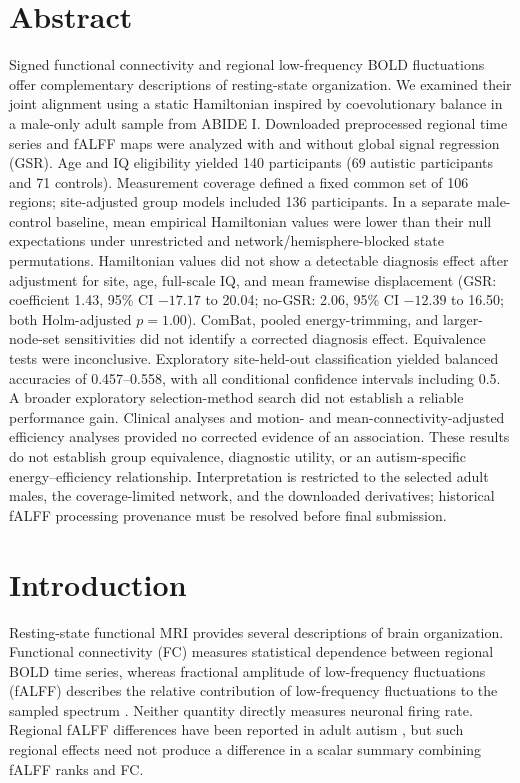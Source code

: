 \documentclass[10pt,letterpaper]{article}
\begin{document}
\section*{Abstract}
Signed functional connectivity and regional low-frequency BOLD fluctuations offer
complementary descriptions of resting-state organization. We examined their joint
alignment using a static Hamiltonian inspired by coevolutionary balance in a
male-only adult sample from ABIDE I. Downloaded preprocessed regional time series
and fALFF maps were analyzed with and without global signal regression (GSR).
Age and IQ eligibility yielded 140 participants (69 autistic participants and
71 controls). Measurement coverage defined a fixed common set of 106 regions;
site-adjusted group models included 136 participants. In a separate male-control
baseline, mean empirical Hamiltonian values were lower than their null expectations
under unrestricted and network/hemisphere-blocked state permutations. Hamiltonian values did not
show a detectable diagnosis effect after adjustment for site, age, full-scale IQ,
and mean framewise displacement (GSR: coefficient 1.43, 95\% CI $-17.17$ to 20.04;
no-GSR: 2.06, 95\% CI $-12.39$ to 16.50; both Holm-adjusted $p=1.00$).
ComBat, pooled energy-trimming, and larger-node-set sensitivities did not identify
a corrected diagnosis effect. Equivalence tests were inconclusive. Exploratory
site-held-out classification yielded balanced accuracies of 0.457--0.558, with
all conditional confidence intervals including 0.5.
A broader exploratory selection-method search did not establish a reliable performance gain. Clinical analyses and
motion- and mean-connectivity-adjusted efficiency analyses provided no corrected
evidence of an association. These results do not establish group equivalence,
diagnostic utility, or an autism-specific energy--efficiency relationship.
Interpretation is restricted to the selected adult males, the coverage-limited
network, and the downloaded derivatives; historical fALFF processing provenance
must be resolved before final submission.

\clearpage
{}
\linenumbers

\section*{Introduction}
Resting-state functional MRI provides several descriptions of brain organization.
Functional connectivity (FC) measures statistical dependence between regional
BOLD time series, whereas fractional amplitude of low-frequency fluctuations
(fALFF) describes the relative contribution of low-frequency fluctuations to the
sampled spectrum \cite{Zou:2008fa}. Neither quantity directly measures neuronal
firing rate. Regional fALFF differences have been reported in adult autism
\cite{Itahashi2015revision}, but such regional effects need not produce a difference
in a scalar summary combining fALFF ranks and FC.
\end{document}
